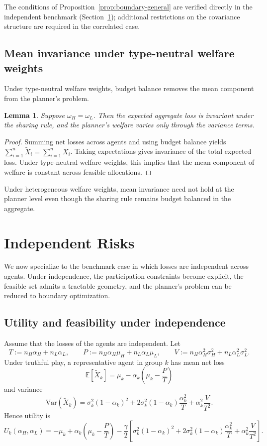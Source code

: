 \documentclass[a4paper,12pt]{article}
\newtheorem{lemma}[theorem]{Lemma}
\theoremstyle{definition}
\theoremstyle{remark}
\newcommand{\Var}{\mathrm{Var}}
\newcommand{\1}{\mathbf{1}}
\begin{document}
The conditions of Proposition~\ref{prop:boundary-general} are verified directly in the independent benchmark (Section~\ref{sec:ind}); additional restrictions on the covariance structure are required in the correlated case.

\subsection{Mean invariance under type-neutral welfare weights}

Under type-neutral welfare weights, budget balance removes the mean component from the planner's problem.

\begin{lemma}\label{lem:mean-invariance}
Suppose \(\omega_H=\omega_L\). Then the expected aggregate loss is invariant under the sharing rule, and the planner's welfare varies only through the variance terms.
\end{lemma}

\begin{proof}
Summing net losses across agents and using budget balance yields
\(\sum_{i=1}^n \tilde X_i = \sum_{i=1}^n X_i\).
Taking expectations gives invariance of the total expected loss. Under type-neutral welfare weights, this implies that the mean component of welfare is constant across feasible allocations.
\end{proof}

Under heterogeneous welfare weights, mean invariance need not hold at the planner level even though the sharing rule remains budget balanced in the aggregate.


\section{Independent Risks}\label{sec:ind}

We now specialize to the benchmark case in which losses are independent across agents. Under independence, the participation constraints become explicit, the feasible set admits a tractable geometry, and the planner's problem can be reduced to boundary optimization.

\subsection{Utility and feasibility under independence}

Assume that the losses of the agents are independent. Let
\[
T := n_H \alpha_H + n_L \alpha_L,
\qquad
P := n_H \alpha_H \mu_H + n_L \alpha_L \mu_L,
\qquad
V := n_H \alpha_H^2 \sigma_H^2 + n_L \alpha_L^2 \sigma_L^2 .
\]
Under truthful play, a representative agent in group \(k\) has mean net loss
\[
\mathbb E[\tilde X_k]
=
\mu_k-\alpha_k\!\left(\mu_k-\frac{P}{T}\right)
\]
and variance
\[
\Var(\tilde X_k)
=
\sigma_k^2(1-\alpha_k)^2 + 2\sigma_k^2(1-\alpha_k)\frac{\alpha_k^2}{T} + \alpha_k^2 \frac{V}{T^2}.
\]
Hence utility is
\begin{equation}\label{eq:utility-alpha-ind-new}
U_k(\alpha_H,\alpha_L)
=
-\mu_k
+
\alpha_k\!\left(\mu_k-\frac{P}{T}\right)
-
\frac{\gamma}{2}
\left[
\sigma_k^2(1-\alpha_k)^2 + 2\sigma_k^2(1-\alpha_k)\frac{\alpha_k^2}{T} + \alpha_k^2 \frac{V}{T^2}
\right].
\end{equation}
\end{document}
